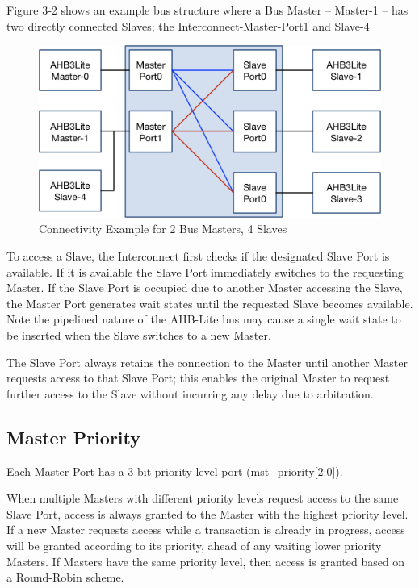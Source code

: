 Figure 3‑2 shows an example bus structure where a Bus Master -- Master-1
-- has two directly connected Slaves; the Interconnect-Master-Port1 and
Slave-4

\begin{figure}[tbh]
	\includegraphics{assets/img/ahb-lite-switch-sys2.png}
	\caption{Connectivity Example	for 2 Bus Masters, 4 Slaves}
	\label{fig:ahb-lite-switch-sys1}
\end{figure}



To access a Slave, the Interconnect first checks if the designated Slave
Port is available. If it is available the Slave Port immediately
switches to the requesting Master. If the Slave Port is occupied due to
another Master accessing the Slave, the Master Port generates wait
states until the requested Slave becomes available. Note the pipelined
nature of the AHB-Lite bus may cause a single wait state to be inserted
when the Slave switches to a new Master.

The Slave Port always retains the connection to the Master until another
Master requests access to that Slave Port; this enables the original
Master to request further access to the Slave without incurring any
delay due to arbitration.

\subsection{Master Priority}\label{master-priority}

Each Master Port has a 3-bit priority level port
(mst\_priority[2:0]).

When multiple Masters with different priority levels request access to
the same Slave Port, access is always granted to the Master with the
highest priority level. If a new Master requests access while a
transaction is already in progress, access will be granted according to
its priority, ahead of any waiting lower priority Masters. If Masters
have the same priority level, then access is granted based on a
Round-Robin scheme.

